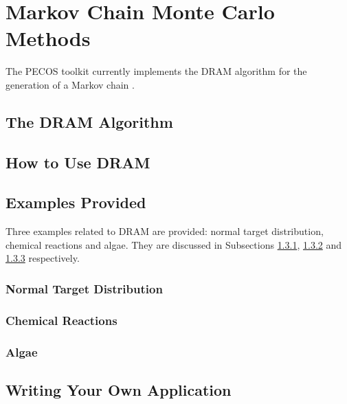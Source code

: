 \chapter{Markov Chain Monte Carlo Methods}\label{ch-mcmc}
\thispagestyle{headings}

The PECOS toolkit currently implements the DRAM algorithm for the generation of a Markov chain \cite{HaLaMiSa06}.

\section{The DRAM Algorithm}

\section{How to Use DRAM}

\section{Examples Provided}

Three examples related to DRAM are provided: normal target distribution, chemical reactions and algae.
They are discussed in Subsections \ref{subsc-dram-normal-ex}, \ref{subsc-dram-himmel-ex} and \ref{subsc-dram-algae-ex} respectively.

\subsection{Normal Target Distribution}\label{subsc-dram-normal-ex}

\subsection{Chemical Reactions}\label{subsc-dram-himmel-ex}

\subsection{Algae}\label{subsc-dram-algae-ex}

\section{Writing Your Own Application}
